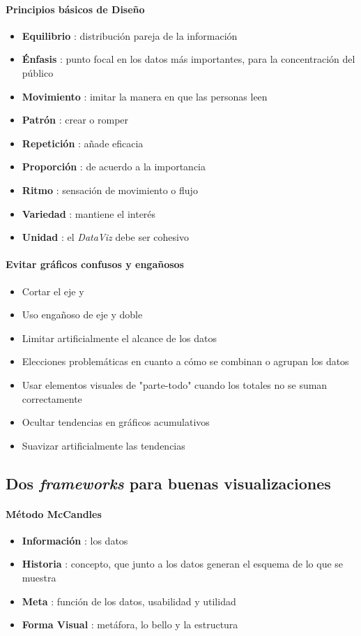 \paragraph{Principios básicos de Diseño}
\begin{itemize}
    \item {\textbf{Equilibrio} : distribución pareja de la información}
    \item {\textbf{Énfasis} : punto focal en los datos más importantes, para la concentración del público}
    \item {\textbf{Movimiento} : imitar la manera en que las personas leen}
    \item {\textbf{Patrón} : crear o romper}
    \item {\textbf{Repetición} : añade eficacia}
    \item {\textbf{Proporción} : de acuerdo a la importancia}
    \item {\textbf{Ritmo} : sensación de movimiento o flujo}
    \item {\textbf{Variedad} : mantiene el interés}
    \item {\textbf{Unidad} : el \textit{DataViz} debe ser cohesivo}
\end{itemize}

\paragraph{Evitar gráficos confusos y engañosos}
\begin{itemize}
    \item {Cortar el eje y}
    \item {Uso engañoso de eje y doble}
    \item {Limitar artificialmente el alcance de los datos}
    \item {Elecciones problemáticas en cuanto a cómo se combinan o agrupan los datos}
    \item {Usar elementos visuales de "parte-todo" cuando los totales no se suman correctamente}
    \item {Ocultar tendencias en gráficos acumulativos}
    \item {Suavizar artificialmente las tendencias}
\end{itemize}

\subsection{Dos \textit{frameworks} para buenas visualizaciones}
\paragraph{Método McCandles}
\begin{itemize}
    \item {\textbf{Información} : los datos}
    \item {\textbf{Historia} : concepto, que junto a los datos generan el esquema de lo que se muestra}
    \item {\textbf{Meta} : función de los datos, usabilidad y utilidad}
    \item {\textbf{Forma Visual} : metáfora, lo bello y la estructura}
\end{itemize}


